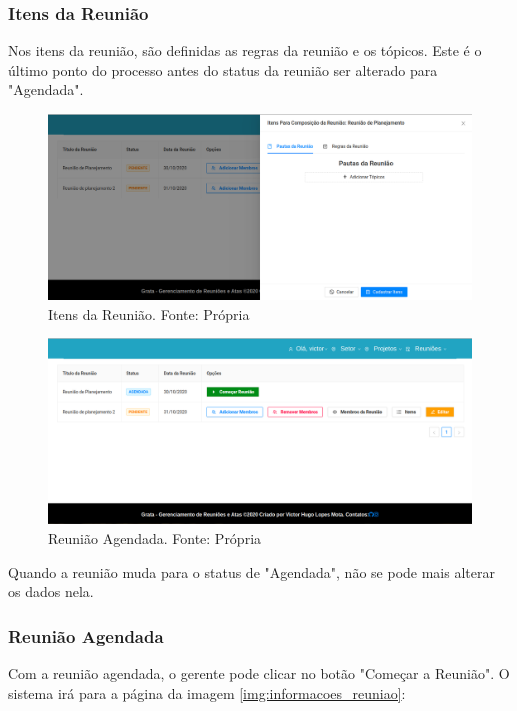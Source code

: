 \subsubsection{Itens da Reunião}

Nos itens da reunião, são definidas as regras da reunião e os tópicos. Este é o último ponto do processo antes do status da reunião ser alterado para "Agendada".

\begin{figure}[H]
    \centering
    \includegraphics[width=1.0\textwidth]{figuras/itens_reuniao.png}
    \caption{Itens da Reunião. Fonte: Própria}
    \label{img:itens_da_reuniao}
\end{figure}

\begin{figure}[H]
    \centering
    \includegraphics[width=1.0\textwidth]{figuras/reuniao_agendada.png}
    \caption{Reunião Agendada. Fonte: Própria}
    \label{img:itens_da_reuniao}
\end{figure}

Quando a reunião muda para o status de "Agendada", não se pode mais alterar os dados nela.

\subsubsection{Reunião Agendada}

Com a reunião agendada, o gerente pode clicar no botão "Começar a Reunião". O sistema irá para a página da imagem \ref{img:informacoes_reuniao}:

